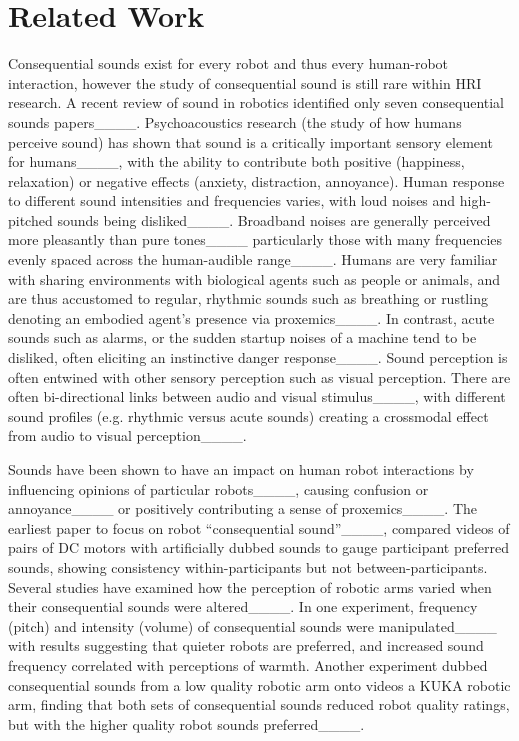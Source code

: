 \section{Related Work}
\label{sec:related-works}
Consequential sounds exist for every robot and thus every human-robot interaction, however the study of consequential sound is still rare within HRI research. A recent review of sound in robotics identified only seven consequential sounds papers____. Psychoacoustics research (the study of how humans perceive sound) has shown that sound is a critically important sensory element for humans____, with the ability to contribute both positive (happiness, relaxation) or negative effects (anxiety, distraction, annoyance). Human response to different sound intensities and frequencies varies, with loud noises and high-pitched sounds being disliked____. Broadband noises are generally perceived more pleasantly than pure tones____ particularly those with many frequencies evenly spaced across the human-audible range____. Humans are very familiar with sharing environments with biological agents such as people or animals, and are thus accustomed to regular, rhythmic sounds such as breathing or rustling denoting an embodied agent's presence via proxemics____. In contrast, acute sounds such as alarms, or the sudden startup noises of a machine tend to be disliked, often eliciting an instinctive danger response____. Sound perception is often entwined with other sensory perception such as visual perception. There are often bi-directional links between audio and visual stimulus____, with different sound profiles (e.g. rhythmic versus acute sounds) creating a crossmodal effect from audio to visual perception____.

Sounds have been shown to have an impact on human robot interactions by influencing opinions of particular robots____, causing confusion or annoyance____ or positively contributing a sense of proxemics____. The earliest paper to focus on robot ``consequential sound''____, compared videos of pairs of DC motors with artificially dubbed sounds to gauge participant preferred sounds, showing consistency within-participants but not between-participants. Several studies have examined how the perception of robotic arms varied when their consequential sounds were altered____. In one experiment, frequency (pitch) and intensity (volume) of consequential sounds were manipulated____ with results suggesting that quieter robots are preferred, and increased sound frequency correlated with perceptions of warmth. Another experiment dubbed consequential sounds from a low quality robotic arm onto videos a KUKA robotic arm, finding that both sets of consequential sounds reduced robot quality ratings, but with the higher quality robot sounds preferred____.


